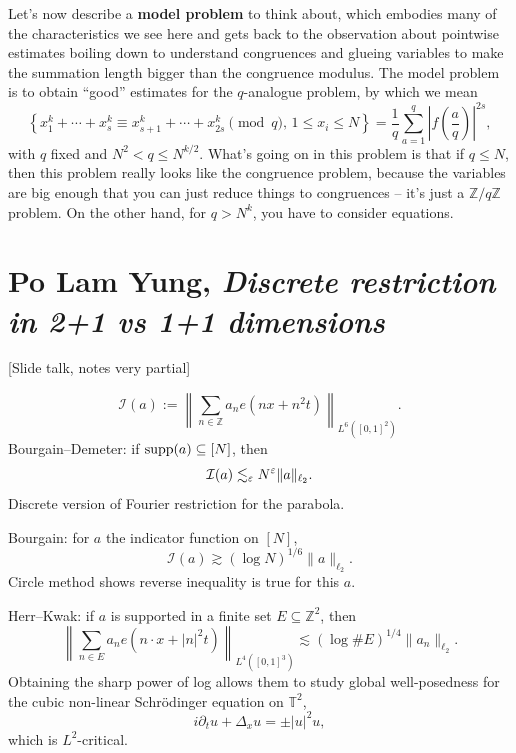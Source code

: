\documentclass[reqno]{amsart} 
\numberwithin{theorem}{section}
\numberwithin{equation}{section}
\begin{document}
Let's now describe a \textbf{model problem} to think about, which embodies many of the characteristics we see here and gets back to the observation about pointwise estimates boiling down to understand congruences and glueing variables to make the summation length bigger than the congruence modulus.  The model problem is to obtain ``good'' estimates for the $q$-analogue problem, by which we mean
\begin{equation*}
  \left\{ x_1^k + \dotsb + x_s^k \equiv x_{s + 1}^k + \dotsb + x_{2 s}^k \pmod{q},
    \,
    1 \leq x_i \leq N\right\}
  = \frac{1}{q}
  \sum_{a = 1}^q \left\lvert f \left( \frac{a}{q} \right) \right\rvert^{2 s},
\end{equation*}
with $q$ fixed and $N^2 < q \leq N^{k / 2}$.  What's going on in this problem is that if $q \leq N$, then this problem really looks like the congruence problem, because the variables are big enough that you can just reduce things to congruences -- it's just a $\mathbb{Z} / q \mathbb{Z}$ problem.  On the other hand, for $q > N^k$, you have to consider equations.

\section{Po Lam Yung, \emph{Discrete restriction in 2+1 vs 1+1 dimensions}}
[Slide talk, notes very partial]


\begin{equation*}
  \mathcal{I}(a) := \left\lVert \sum_{n \in \mathbb{Z}} a_n e(n x + n^2 t) \right\rVert_{L^6([0, 1]^2)}.
\end{equation*}
Bourgain--Demeter: if $\operatorname{supp}(a) \subseteq[N]$, then
\begin{equation*}
  \mathcal{I}(a) \lesssim_\varepsilon N^\varepsilon \lVert a \rVert_{\ell_2}.
\end{equation*}
Discrete version of Fourier restriction for the parabola.

Bourgain: for $a$ the indicator function on $[N]$,
\begin{equation*}
  \mathcal{I}(a) \gtrsim(\log N)^{1/6} \lVert a \rVert_{\ell_2}.
\end{equation*}
Circle method shows reverse inequality is true for this $a$.

Herr--Kwak: if $a$ is supported in a finite set $E \subseteq \mathbb{Z}^2$, then
\begin{equation*}
  \left\lVert \sum_{n \in E} a_n e(n \cdot x + \lvert n \rvert^2 t) \right\rVert_{L^4([0, 1]^3)} \lesssim(\log \# E)^{1/4} \lVert a_n \rVert_{\ell_2}.
\end{equation*}
Obtaining the sharp power of log allows them to study global well-posedness for the cubic non-linear Schrödinger equation on $\mathbb{T}^2$,
\begin{equation*}
  i \partial_t u + \Delta_x u = \pm \lvert u \rvert^2 u,
\end{equation*}
which is $L^2$-critical.
\end{document}
